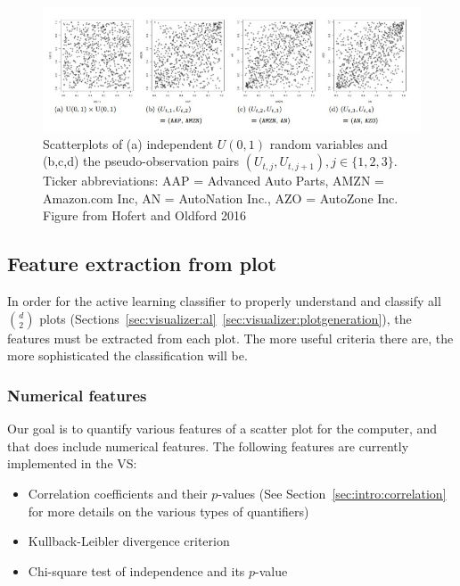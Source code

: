 \begin{figure}[htb]
	\begin{center}
		\includegraphics[width=1\linewidth]{ch-visualizer/figures/hofertoldford}
		\caption[Scatterplots of independent $U(0,1)$ random variables and the
		pseudo-observation pairs $(U_{t,j},U_{t,j+1}),j\in 
		\{1,2,3\}$.]{Scatterplots of
			(a) independent $U(0,1)$ random variables and (b,c,d) the 
			pseudo-observation
			pairs $(U_{t,j},U_{t,j+1}),j\in \{1,2,3\}$. Ticker abbreviations: 
			AAP = Advanced
			Auto Parts, AMZN = Amazon.com Inc, AN = AutoNation Inc., AZO = 
			AutoZone Inc.
			Figure from Hofert and Oldford 2016~\cite{hofert2016}}
		\label{fig:visualizer:hofertoldford}
	\end{center}
\end{figure}

\subsection{Feature extraction from plot}
\label{sec:visualizer:scatterplot:features}

In order for the active learning classifier to properly understand and classify 
all $d \choose 2$ plots 
(Sections~\ref{sec:visualizer:al}~\ref{sec:visualizer:plotgeneration}), the 
features must be extracted from each plot. The more useful criteria there are, 
the more sophisticated the classification will be.

\subsubsection{Numerical features}

Our goal is to quantify various features of a scatter plot for the computer, 
and that does include numerical features. The following features are currently 
implemented in the VS: 

\tablespacing
\begin{itemize}
	\item Correlation coefficients and their $p$-values (See 
	Section~\ref{sec:intro:correlation} for more details on the various types 
	of quantifiers)
	\item Kullback-Leibler divergence criterion
	\item Chi-square test of independence and its $p$-value
\end{itemize}
\bodyspacing 

